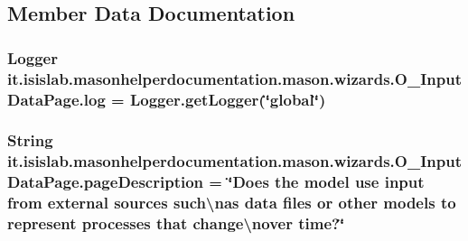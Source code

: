 \subsection{Member Data Documentation}
\hypertarget{classit_1_1isislab_1_1masonhelperdocumentation_1_1mason_1_1wizards_1_1_o___input_data_page_adc21476c8083a27e69b68859bd664039}{
\subsubsection[{log}]{\setlength{\rightskip}{0pt plus 5cm}Logger it.\-isislab.\-masonhelperdocumentation.\-mason.\-wizards.\-O\-\_\-\-Input\-Data\-Page.\-log = Logger.\-get\-Logger(\char`\"{}global\char`\"{})\hspace{0.3cm}{\ttfamily [private]}}}\label{classit_1_1isislab_1_1masonhelperdocumentation_1_1mason_1_1wizards_1_1_o___input_data_page_adc21476c8083a27e69b68859bd664039}
\hypertarget{classit_1_1isislab_1_1masonhelperdocumentation_1_1mason_1_1wizards_1_1_o___input_data_page_af9749fa490c25ae4232cd9adcb5e37c4}{
\subsubsection[{page\-Description}]{\setlength{\rightskip}{0pt plus 5cm}String it.\-isislab.\-masonhelperdocumentation.\-mason.\-wizards.\-O\-\_\-\-Input\-Data\-Page.\-page\-Description = \char`\"{}Does the model use input from external sources such\textbackslash{}nas data files or other models to represent processes that change\textbackslash{}nover time?\char`\"{}\hspace{0.3cm}{\ttfamily [private]}}}\label{classit_1_1isislab_1_1masonhelperdocumentation_1_1mason_1_1wizards_1_1_o___input_data_page_af9749fa490c25ae4232cd9adcb5e37c4}
